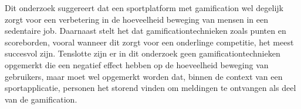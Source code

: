 Dit onderzoek suggereert dat een sportplatform met gamification wel degelijk zorgt voor een verbetering in de hoeveelheid beweging van mensen in een sedentaire job. Daarnaast stelt het dat gamificationtechnieken zoals punten en scoreborden, vooral wanneer dit zorgt voor een onderlinge competitie, het meest succesvol zijn. Tenslotte zijn er in dit onderzoek geen gamificationtechnieken opgemerkt die een negatief effect hebben op de hoeveelheid beweging van gebruikers, maar moet wel opgemerkt worden dat, binnen de context van een sportapplicatie, personen het storend vinden om meldingen te ontvangen als deel van de gamification.